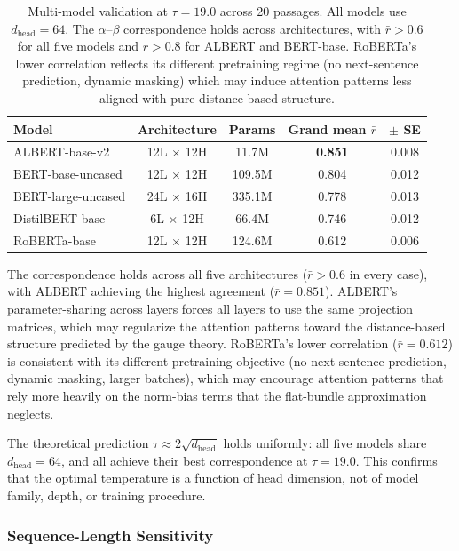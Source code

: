 \documentclass[twoside,11pt]{article}
\begin{document}
\begin{table}[h]
\centering
\renewcommand{\arraystretch}{1.15}
\begin{tabular}{lcccc}
\hline
\textbf{Model} & \textbf{Architecture} & \textbf{Params} & Grand mean $\bar{r}$ & $\pm$ SE \\
\hline
ALBERT-base-v2       & 12L $\times$ 12H & 11.7M  & \textbf{0.851} & 0.008 \\
BERT-base-uncased    & 12L $\times$ 12H & 109.5M & 0.804 & 0.012 \\
BERT-large-uncased   & 24L $\times$ 16H & 335.1M & 0.778 & 0.013 \\
DistilBERT-base      & 6L $\times$ 12H  & 66.4M  & 0.746 & 0.012 \\
RoBERTa-base         & 12L $\times$ 12H & 124.6M & 0.612 & 0.006 \\
\hline
\end{tabular}
\caption{Multi-model validation at $\tau = 19.0$ across 20 passages. All models use $d_{\text{head}} = 64$. The $\alpha$--$\beta$ correspondence holds across architectures, with $\bar{r} > 0.6$ for all five models and $\bar{r} > 0.8$ for ALBERT and BERT-base. RoBERTa's lower correlation reflects its different pretraining regime (no next-sentence prediction, dynamic masking) which may induce attention patterns less aligned with pure distance-based structure.}
\label{tab:multi_model}
\end{table}

The correspondence holds across all five architectures ($\bar{r} > 0.6$ in every case), with ALBERT achieving the highest agreement ($\bar{r} = 0.851$). ALBERT's parameter-sharing across layers forces all layers to use the same projection matrices, which may regularize the attention patterns toward the distance-based structure predicted by the gauge theory. RoBERTa's lower correlation ($\bar{r} = 0.612$) is consistent with its different pretraining objective (no next-sentence prediction, dynamic masking, larger batches), which may encourage attention patterns that rely more heavily on the norm-bias terms that the flat-bundle approximation neglects.

The theoretical prediction $\tau \approx 2\sqrt{d_{\text{head}}}$ holds uniformly: all five models share $d_{\text{head}} = 64$, and all achieve their best correspondence at $\tau = 19.0$. This confirms that the optimal temperature is a function of head dimension, not of model family, depth, or training procedure.


\subsubsection{Sequence-Length Sensitivity}
\label{sec:seqlen}
\end{document}
